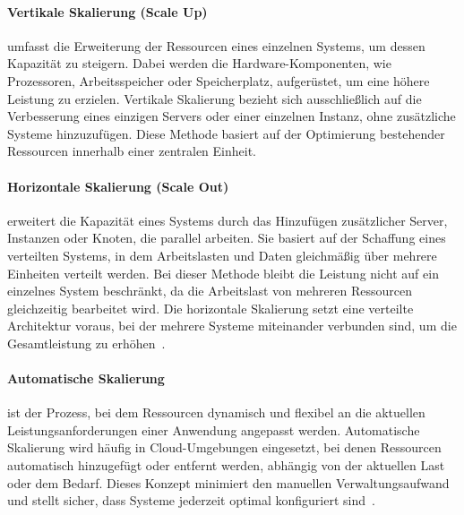 \paragraph{Vertikale Skalierung (Scale Up)} umfasst die Erweiterung der Ressourcen eines einzelnen Systems, um dessen
Kapazität zu steigern.
Dabei werden die Hardware-Komponenten, wie Prozessoren, Arbeitsspeicher oder Speicherplatz, aufgerüstet,
um eine höhere Leistung zu erzielen.
Vertikale Skalierung bezieht sich ausschließlich auf die Verbesserung eines einzigen Servers oder einer
einzelnen Instanz, ohne zusätzliche Systeme hinzuzufügen.
Diese Methode basiert auf der Optimierung bestehender Ressourcen innerhalb einer zentralen Einheit.
\paragraph{Horizontale Skalierung (Scale Out)} erweitert die Kapazität eines Systems durch das Hinzufügen
zusätzlicher Server, Instanzen oder Knoten, die parallel arbeiten.
Sie basiert auf der Schaffung eines verteilten Systems, in dem Arbeitslasten und Daten gleichmäßig
über mehrere Einheiten verteilt werden.
Bei dieser Methode bleibt die Leistung nicht auf ein einzelnes System beschränkt, da die Arbeitslast von mehreren
Ressourcen gleichzeitig bearbeitet wird.
Die horizontale Skalierung setzt eine verteilte Architektur voraus, bei der mehrere Systeme miteinander verbunden sind,
um die Gesamtleistung zu erhöhen~\cite{ibm-scaling}.
\paragraph{Automatische Skalierung} ist der Prozess, bei dem Ressourcen dynamisch und flexibel an die aktuellen
Leistungsanforderungen einer Anwendung angepasst werden.
Automatische Skalierung wird häufig in Cloud-Umgebungen eingesetzt, bei denen Ressourcen automatisch hinzugefügt
oder entfernt werden, abhängig von der aktuellen Last oder dem Bedarf.
Dieses Konzept minimiert den manuellen Verwaltungsaufwand und stellt sicher, dass Systeme jederzeit optimal
konfiguriert sind~\cite{mic-autoscaling}.


